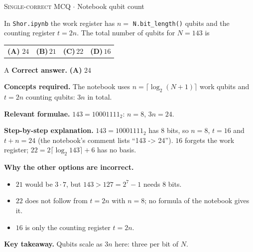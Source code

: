 \documentclass[11pt,a4paper]{article}
\newcommand{\optlabel}[1]{\textbf{(#1)}}
\newcommand{\correctlabel}[1]{\textcolor{okgreen}{\textbf{(#1)}\,\ding{51}}}
\newenvironment{qitem}[1]{\begin{list}{}{\setlength{\leftmargin}{3.3em}\setlength{\labelwidth}{3.1em}%
  \setlength{\labelsep}{0.2em}\setlength{\topsep}{3pt}\setlength{\parsep}{3pt}}\item[\textbf{Q.#1}\hfill]}{\end{list}}
\newcommand{\qsep}{\par\vspace{2pt}{\color{black!15}\hrule}\vspace{4pt}}
\newcommand{\qmeta}[2]{{\footnotesize\color{black!60}\textsc{#1} \;$\cdot$\; #2}\par}
\begin{document}
\begin{qitem}{33}
\qmeta{Single-correct MCQ}{Notebook qubit count}
In \texttt{Shor.ipynb} the work register has $n = $ \texttt{N.bit\_length()} qubits and the counting register $t = 2n$. The total number of qubits for
$N = 143$ is
\par\smallskip\noindent\begin{tabularx}{\linewidth}{@{}*{4}{L}@{}}
\correctlabel{A}\,$24$ & \optlabel{B}\,$21$ & \optlabel{C}\,$22$ & \optlabel{D}\,$16$
\end{tabularx}
\end{qitem}
\begin{solbox}{A}
\textbf{\color{brand}Correct answer.} \textcolor{okgreen}{\textbf{(A)}} $24$

\textbf{\color{brand}Concepts required.} The notebook uses $n = \lceil\log_2(N + 1)\rceil$ work qubits and $t = 2n$ counting qubits: $3n$ in total.

\textbf{\color{brand}Relevant formulae.} $143 = 10001111_2$: $n = 8$, $3n = 24$.

\textbf{\color{brand}Step-by-step explanation.} $143 = 10001111_2$ has $8$ bits, so $n = 8$, $t = 16$ and $t + n = 24$ (the notebook's comment lists ``143 -> 24''). $16$ forgets the work register;
$22 = 2\lceil\log_2 143\rceil + 6$ has no basis.

\textbf{\color{brand}Why the other options are incorrect.}
\begin{itemize}[leftmargin=2.4em, itemsep=1pt, topsep=2pt]
\item[\textbf{(B)}] $21$ would be $3\cdot7$, but $143 > 127 = 2^7 - 1$ needs $8$ bits.
\item[\textbf{(C)}] $22$ does not follow from $t = 2n$ with $n = 8$; no formula of the notebook gives it.
\item[\textbf{(D)}] $16$ is only the counting register $t = 2n$.
\end{itemize}
\textbf{\color{brand}Key takeaway.} Qubits scale as $3n$ here: three per bit of $N$.
\end{solbox}
\qsep
\end{document}
